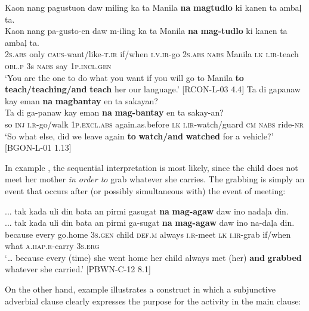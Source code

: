 \z
\ea
Kaon  nang  pagustuon  daw  miling  ka  ta  Manila \textbf{na}  \textbf{magtudlo}  ki  kanen  ta  ambaļ  ta. \smallskip\\
\gll Kaon  nang  pa-gusto-en  daw  m-iling  ka  ta  Manila \textbf{na}  \textbf{mag-tudlo}  ki  kanen  ta  ambaļ  ta. \\
2\textsc{s.abs}  only  \textsc{caus}-want/like-\textsc{t.ir}  if/when  \textsc{i.v.ir}-go  2\textsc{s.abs}  \textsc{nabs}  Manila
\textsc{lk}  \textsc{i.ir}-teach  \textsc{obl.p}  3s  \textsc{nabs}  say  1\textsc{p.incl.gen} \\
\glt `You are the one to do what you want if you will go to Manila \textbf{to} \textbf{teach/teaching/and} \textbf{teach} her our language.’ [RCON-L-03 4.4]
\z
\ea
\label{bkm:Ref474489008}
Ta  di  gapanaw  kay  eman  \textbf{na}  \textbf{magbantay} en  ta  sakayan? \smallskip\\
\gll Ta  di  ga-panaw  kay  eman  \textbf{na}  \textbf{mag-bantay} en  ta  sakay-an? \\
so  \textsc{inj}  \textsc{i.r}-go/walk  1\textsc{p.excl.abs}  again.as.before  \textsc{lk}  \textsc{i.ir}-watch/guard
\textsc{cm}  \textsc{nabs}  ride-\textsc{nr} \\
\glt `So what else, did we leave again \textbf{to} \textbf{watch/and} \textbf{watched} for a vehicle?’ [BGON-L-01 1.13]
\z

In example , the sequential interpretation is most likely, since the child does not meet her mother \textit{in order to} grab whatever she carries. The grabbing is simply an event that occurs after (or possibly simultaneous with) the event of meeting:

\ea
\label{bkm:Ref474395434}
... tak  kada  uli  din  bata  an  pirmi  gasugat \textbf{na}  \textbf{mag-agaw}  daw  ino  nadaļa  din. \smallskip\\
\gll ... tak  kada  uli  din  bata  an  pirmi  ga-sugat \textbf{na}  \textbf{mag-agaw}  daw  ino  na-daļa  din. \\
{}   because  every  go.home  3\textsc{s.gen}  child  \textsc{def.m}  always  \textsc{i.r}-meet
\textsc{lk}  \textsc{i.ir}-grab  if/when  what  \textsc{a.hap.r}-carry  3\textsc{s.erg} \\
\glt `… because every (time) she went home her child always met (her) \textbf{and} \textbf{grabbed} whatever she carried.’ [PBWN-C-12 8.1]
\z

On the other hand, example  illustrates a construct in which a subjunctive adverbial clause clearly expresses the purpose for the activity in the main clause:

